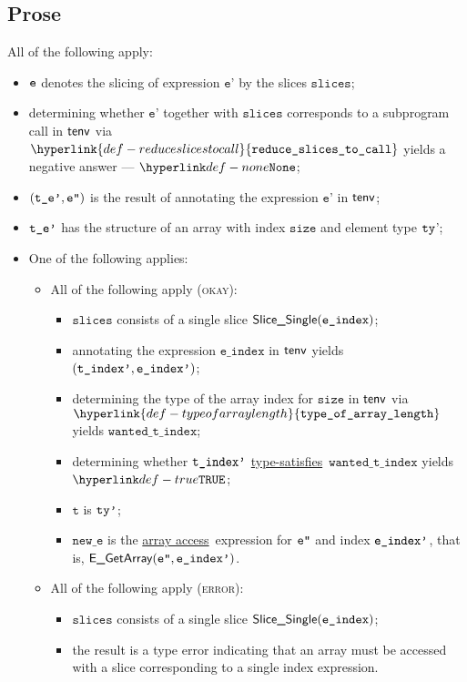\documentclass{book}
\newcommand\ProseOrTypeError[0]{\ProseTerminateAs{\TypeErrorConfig}}
\newcommand\typesatisfies[0]{\hyperlink{def-typesatisfies}{type-satisfies}}
\newcommand\arrayaccess[0]{\hyperlink{def-arrayaccess}{array access}}
\newcommand\reduceslicestocall[0]{\hyperlink{def-reduceslicestocall}{\texttt{reduce\_slices\_to\_call}}}
\newcommand\typeofarraylength[0]{\hyperlink{def-typeofarraylength}{\texttt{type\_of\_array\_length}}}
\newcommand\vt[0]{\texttt{t}}
\newcommand\size[0]{\texttt{size}}
\newcommand\eindex[0]{\texttt{e\_index}}
\newcommand\wantedtindex[0]{\texttt{wanted\_t\_index}}
\newcommand\slices[0]{\texttt{slices}}
\newcommand\newe[0]{\texttt{new\_e}}
\newcommand\vep[0]{\texttt{e'}}
\begin{document}
\subsection{Prose}
All of the following apply:
\begin{itemize}
  \item $\texttt{e}$ denotes the slicing of expression $\vep$ by the slices $\slices$;
  \item determining whether $\vep$ together with $\slices$ corresponds to a subprogram call
        in $\textsf{tenv}$ via $\reduceslicestocall$ yields a negative answer --- $\None$\ProseOrTypeError;
  \item $(\texttt{t\_e'},\texttt{e''})$ is the result of annotating the expression $\vep$ in $\textsf{tenv}$;
  \item $\texttt{t\_e'}$ has the structure of an array with index $\size$ and element type $\texttt{ty}$';
  \item One of the following applies:
  \begin{itemize}
    \item All of the following apply (\textsc{okay}):
    \begin{itemize}
      \item $\slices$ consists of a single slice $\SliceSingle(\eindex)$;
      \item annotating the expression $\eindex$ in $\textsf{tenv}$ yields $(\texttt{t\_index'}, \texttt{e\_index'})$\ProseOrTypeError;
      \item determining the type of the array index for $\size$ in $\textsf{tenv}$ via \\ $\typeofarraylength$
            yields $\wantedtindex$;
      \item determining whether $\texttt{t\_index'}$ \typesatisfies\ $\wantedtindex$ yields \\
            $\True$\ProseOrTypeError;
      \item $\vt$ is $\texttt{ty'}$;
      \item $\newe$ is the \arrayaccess\ expression for $\texttt{e''}$ and index $\texttt{e\_index'}$, that is, $\textsf{E\_GetArray}(\texttt{e''}, \texttt{e\_index'})$.
    \end{itemize}

    \item All of the following apply (\textsc{error}):
    \begin{itemize}
      \item $\slices$ consists of a single slice $\SliceSingle(\eindex)$;
      \item the result is a type error indicating that an array must be accessed with a slice corresponding
            to a single index expression.
    \end{itemize}
  \end{itemize}
\end{itemize}
\end{document}
